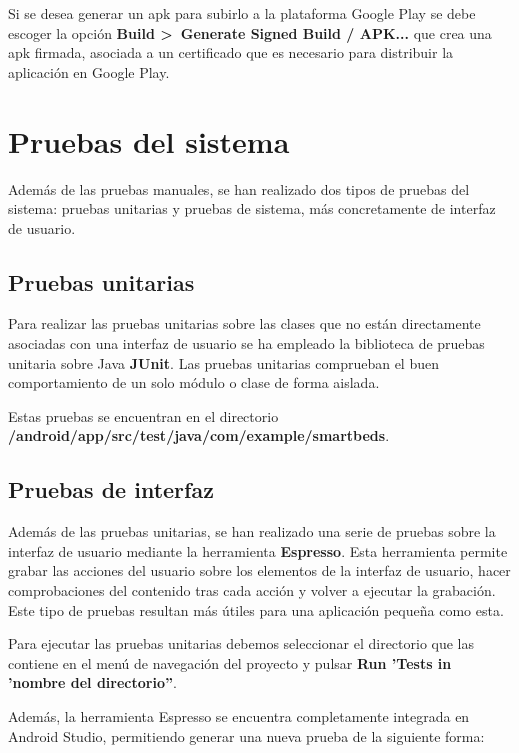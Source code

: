 Si se desea generar un apk para subirlo a la plataforma Google Play se debe escoger la opción \textbf{Build >~Generate Signed Build / APK...} que crea una apk firmada, asociada a un certificado que es necesario para distribuir la aplicación en Google Play. 

\section{Pruebas del sistema}

Además de las pruebas manuales, se han realizado dos tipos de pruebas del sistema: pruebas unitarias y pruebas de sistema, más concretamente de interfaz de usuario. 

\subsection{Pruebas unitarias} 

Para realizar las pruebas unitarias sobre las clases que no están directamente asociadas con una interfaz de usuario se ha empleado la biblioteca de pruebas unitaria sobre Java \textbf{JUnit}. Las pruebas unitarias comprueban el buen comportamiento de un solo módulo o clase de forma aislada.

Estas pruebas se encuentran en el directorio \\ \textbf{/android/app/src/test/java/com/example/smartbeds}. 

\subsection{Pruebas de interfaz}

Además de las pruebas unitarias, se han realizado una serie de pruebas sobre la interfaz de usuario mediante la herramienta \textbf{Espresso}. Esta herramienta permite grabar las acciones del usuario sobre los elementos de la interfaz de usuario, hacer comprobaciones del contenido tras cada acción y volver a ejecutar la grabación. Este tipo de pruebas resultan más útiles para una aplicación pequeña como esta. 

Para ejecutar las pruebas unitarias debemos seleccionar el directorio que las contiene en el menú de navegación del proyecto y pulsar \textbf{Run 'Tests in 'nombre del directorio''}. 

Además, la herramienta Espresso se encuentra completamente integrada en Android Studio, permitiendo generar una nueva prueba de la siguiente forma:

